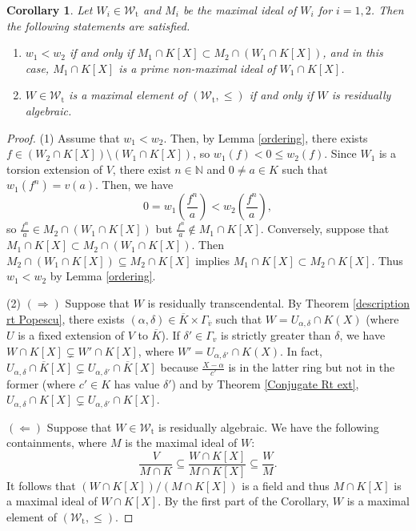 \documentclass[10pt]{article}
\numberwithin{equation}{section}
\newtheorem{Cor}[equation]{Corollary}
\theoremstyle{definition}
\theoremstyle{definition}
\newcommand{\N}{\mathbb{N}}
\renewcommand{\t}{\text{t}}
\newcommand\rc { \color{red}}
\begin{document}
\begin{Cor}\label{w1<w2}
Let $W_i \in \mathcal W_{\t}$ and $M_i$ be the maximal ideal of $W_i$ for $i=1,2$. Then
the following statements are satisfied. 
\begin{enumerate}
\item[{\em (1)}] $w_1<w_2$ if and only if $M_1\cap K[X]\subset M_2\cap(W_1\cap K[X])$, and in this case, 
$M_1\cap K[X]$ is a prime non-maximal ideal of $W_1\cap K[X]$. 
\item[{\em (2)}] $W\in \mathcal{W}_{\t}$ is a maximal element of $(\mathcal W_{\t}, \leq)$ if and only if $W$ is residually algebraic.
\end{enumerate}
\end{Cor}
\begin{proof}
(1) Assume that $w_1<w_2$. Then, by Lemma \ref{ordering}, there exists $f\in (W_2\cap K[X])\setminus (W_1\cap K[X])$, so 
$w_1(f)<0\leq w_2(f)$. Since $W_1$ is a torsion extension of $V$, 
there exist $n\in\N$ and $0 \neq a\in K$ such that $w_1(f^n)=v(a)$. Then, we have
$$0=w_1\left(\frac{f^n}{a}\right)<w_2\left(\frac{f^n}{a}\right),$$
so $\frac{f^n}{a}\in M_2\cap (W_1\cap K[X])$ but $\frac{f^n}{a}\notin M_1\cap K[X]$. Conversely, suppose that 
$M_1\cap K[X]\subset M_2\cap(W_1\cap K[X])$. Then $M_2\cap(W_1\cap K[X]) \subseteq M_2 \cap K[X]$
implies $M_1\cap K[X]\subset M_2 \cap K[X]$. Thus $w_1<w_2$ by Lemma \ref{ordering}.

(2) $(\Rightarrow)$ Suppose that $W$ is residually transcendental. By Theorem \ref{description rt Popescu}, 
there exists $(\alpha,\delta)\in \overline{K}\times\Gamma_{\overline v}$ such that $W=U_{\alpha,\delta}\cap K(X)$ 
(where $U$ is a fixed extension of $V$ to $\overline K$). If $\delta'\in\Gamma_v$ 
is strictly greater than $\delta$, we have 
 $W\cap K[X] \subsetneq W' \cap K[X]$, where $W'=U_{\alpha,\delta'}\cap K(X)$. In fact, $U_{\alpha,\delta}\cap \overline K[X]\subsetneq U_{\alpha,\delta'}\cap\overline{K}[X]$ because $\frac{X-\alpha}{c'}$ is in the latter ring but not in the former (where $c'\in K$ has value $\delta'$) and by Theorem \ref{Conjugate Rt ext}, $U_{\alpha,\delta}\cap K[X]\subsetneq U_{\alpha,\delta'}\cap K[X]$.
 
$(\Leftarrow)$ Suppose that $W\in \mathcal{W}_{\t}$ is residually algebraic. We have the following containments, 
 where $M$ is the maximal ideal of $W$:
$$\frac{V}{M \cap K} \subseteq\frac{W\cap K[X]}{M\cap K[X]}\subseteq\frac{W}{M}.$$
It follows that $(W\cap K[X])/(M\cap K[X])$ is a field and thus $M\cap K[X]$ is a maximal ideal of $W\cap K[X]$. 
By the first part of the Corollary, $W$ is a maximal element of $(\mathcal W_{\t}, \leq)$.
\end{proof}
\end{document}
